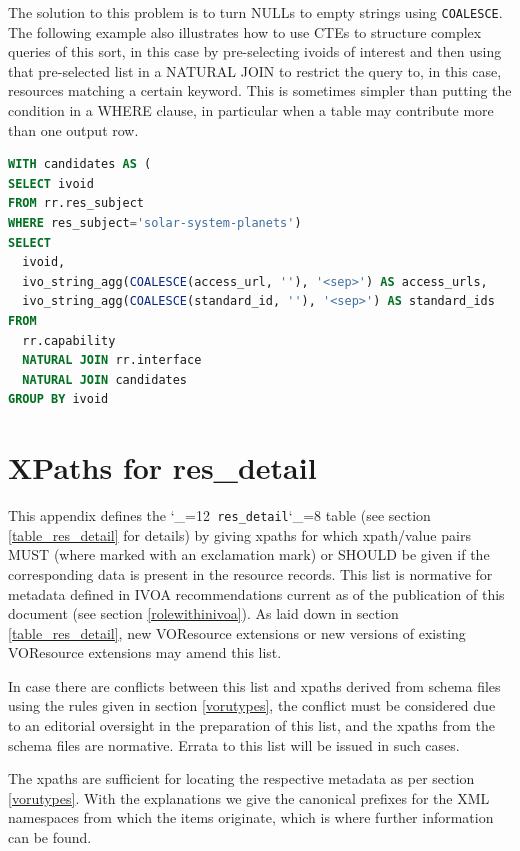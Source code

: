 \documentclass[11pt,a4paper]{ivoa}
\makeatletter
\def\rtent#1{\texttt{\color{rtcolor}\verb|#1|}}
\def\makeunderscoreletter{\catcode`\_=12}
\def\makeunderscoresubscript{\catcode`\_=8}
\def\rtent{\makeunderscoreletter\relax\rt@nt}
\def\rt@nt#1{\texttt{\color{rtcolor} #1}\makeunderscoresubscript{}}
\makeatother
\begin{document}
The solution to this problem is to turn NULLs to empty strings using
\verb|COALESCE|.  The following example also illustrates how to use CTEs
to structure complex queries of this sort, in this case by pre-selecting
ivoids of interest and then using that pre-selected list in a NATURAL
JOIN to restrict the query to, in this case, resources matching a
certain keyword.  This is sometimes simpler than putting the condition
in a WHERE clause, in particular when a table may contribute more than
one output row.

\begin{lstlisting}[language=SQL,basicstyle=\footnotesize]
WITH candidates AS (
SELECT ivoid
FROM rr.res_subject
WHERE res_subject='solar-system-planets')
SELECT
  ivoid,
  ivo_string_agg(COALESCE(access_url, ''), '<sep>') AS access_urls,
  ivo_string_agg(COALESCE(standard_id, ''), '<sep>') AS standard_ids
FROM
  rr.capability
  NATURAL JOIN rr.interface
  NATURAL JOIN candidates
GROUP BY ivoid
\end{lstlisting}



\appendix

\section{XPaths for res\_detail}

\label{d_u_list}

This appendix defines the \rtent{res_detail}
table (see section \ref{table_res_detail} for
details) by giving
xpaths for which xpath/value pairs MUST (where marked with an
exclamation mark) or SHOULD be given if the
corresponding data is present in the resource records.  This list is
normative for metadata defined in IVOA recommendations current as of the
publication of this document (see section \ref{rolewithinivoa}).
As laid down in section \ref{table_res_detail},
new VOResource extensions or new
versions of existing VOResource extensions may amend this list.

In case there are conflicts between this list and xpaths derived
from schema files using the rules given in section \ref{vorutypes}, the conflict must be considered due to an
editorial oversight in the preparation of this list, and the xpaths from the
schema files are normative.  Errata to this list will be issued in such
cases.

The xpaths are sufficient for locating the respective metadata as per
section \ref{vorutypes}.  With the explanations we
give the canonical prefixes for the XML namespaces from which the items
originate, which is where further information can be found.
\end{document}
